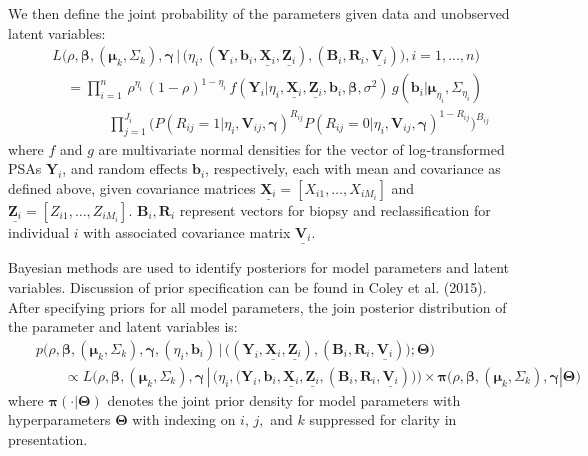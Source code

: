 \documentclass[12pt, letterpaper]{article}
\newcommand{\bmbeta}{\boldsymbol{\beta}}
\newcommand{\bmpi}{\boldsymbol{\pi}}
\newcommand{\bmmu}{\boldsymbol{\mu}}
\newcommand{\bmgamma}{\boldsymbol{\gamma}}
\newcommand{\bmY}{\mathbf{Y}}
\newcommand{\bmZ}{\mathbf{Z}}
\newcommand{\bmX}{\mathbf{X}}
\newcommand{\bmV}{\mathbf{V}}
\newcommand{\bmb}{\mathbf{b}}
\newcommand{\bmTheta}{\boldsymbol{\Theta}}
\newcommand{\bea}{\begin{eqnarray}}
\newcommand{\eea}{\end{eqnarray}}
\newcommand{\mydots}{...}
\begin{document}
We then define the joint probability of the parameters given data and unobserved latent variables: 
\bea
&&L\Big(\rho, \bmbeta, (\bmmu_k, \Sigma_k), \bmgamma\, | \,\big( \eta_i, (\bmY_i, \bmb_i, \underline{\bmX_i}, \underline{\bmZ_i}), (\mathbf{B}_{i}, \mathbf{R}_{i}, \underline{\bmV_{i}}) \big), i=1,\mydots,n \Big) \nonumber \\
&& \quad =  \prod_{i=1}^{n}  \,  \rho^{\eta_i}\,(1-\rho)^{1-\eta_i}\, f(\bmY_i | \eta_i, \underline{\bmX_i}, \underline{\bmZ_i}, \bmb_i, \bmbeta, \sigma^2) \, g(\bmb_i |  \bmmu_{\eta_i}, \Sigma_{\eta_i})  \nonumber \\
\label{eq:lik-inf}
&& \qquad \qquad \prod_{j=1}^{J_i}  \big(P(R_{ij}=1 | \eta_i, \bmV_{ij}, \bmgamma) ^{R_{ij}} P(R_{ij}=0 | \eta_i, \bmV_{ij}, \bmgamma)^{1-R_{ij}} \big)^{B_{ij}} 
\eea
where $f$ and $g$ are multivariate normal densities for the vector of log-transformed PSAs $\bmY_i$, and random effects $\bmb_i$, respectively, each with mean and covariance as defined above, given covariance matrices $\underline{\bmX_i} = [X_{i1},\dots, X_{iM_i}]$ and $\underline{\bmZ_i} = [Z_{i1},\dots, Z_{iM_i}]$. $\mathbf{B}_{i}, \mathbf{R}_{i}$ represent vectors for biopsy and reclassification for individual $i$ with associated covariance matrix $\underline{\bmV_{i}}$.

Bayesian methods are used to identify posteriors for model parameters and latent variables. Discussion of prior specification can be found in Coley et al. (2015). After specifying priors for all model parameters, the join posterior distribution of the parameter and latent variables is:
\bea
&& p\Big(\rho, \bmbeta, (\bmmu_k,\Sigma_k), \bmgamma, (\eta_i,\bmb_i) \,| \, \big( (\bmY_i, \underline{\bmX_i}, \underline{\bmZ_i}), (\mathbf{B}_{i}, \mathbf{R}_{i}, \underline{\bmV_{i}}) \big); \bmTheta\Big) \nonumber\\
\label{eq:post-inf}
&&\qquad  \propto L\Big(\rho,  \bmbeta, (\bmmu_k, \Sigma_k), \bmgamma \, | \,\big(\eta_i, (\bmY_i, \bmb_i, \underline{\bmX_i}, \underline{\bmZ_i},(\mathbf{B}_{i}, \mathbf{R}_{i}, \underline{\bmV_{i}})\big) \Big) \times \bmpi\big(\rho,\bmbeta, (\bmmu_k, \Sigma_k),\bmgamma |\bmTheta\big)
\eea
where $\bmpi(\cdot|\bmTheta)$ denotes the joint prior density for model parameters with hyperparameters $\bmTheta$ with indexing on $i,\,j,$ and $k$ suppressed for clarity in presentation.
\end{document}
